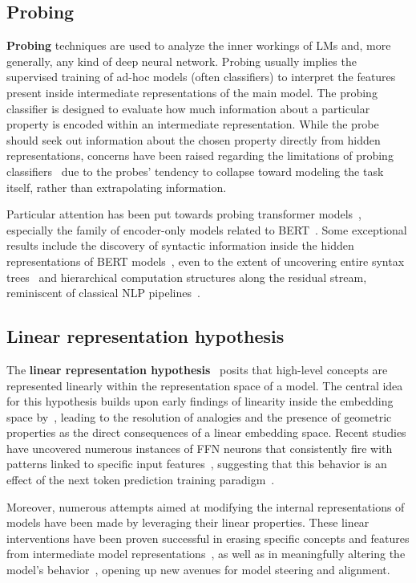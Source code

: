 \subsection{Probing}

\textbf{Probing} techniques are used to analyze the inner workings of LMs and, more generally, any kind of deep neural network.
Probing usually implies the supervised training of ad-hoc models (often classifiers) to interpret the features present inside intermediate representations of the main model.
The probing classifier is designed to evaluate how much information about a particular property is encoded within an intermediate representation.
While the probe should seek out information about the chosen property directly from hidden representations, concerns have been raised regarding the limitations of probing classifiers~\cite{belinkov2022} due to the probes' tendency to collapse toward modeling the task itself, rather than extrapolating information.

Particular attention has been put towards probing transformer models~\cite{chwang2024, macdiarmid2024, burns2023}, especially the family of encoder-only models related to BERT~\cite{devlin2019}.
Some exceptional results include the discovery of syntactic information inside the hidden representations of BERT models~\cite{tenney2019a, lin2019}, even to the extent of uncovering entire syntax trees~\cite{hewitt2019} and hierarchical computation structures along the residual stream, reminiscent of classical NLP pipelines~\cite{tenney2019b}.

\subsection{Linear representation hypothesis}

The \textbf{linear representation hypothesis}~\cite{park2023} posits that high-level concepts are represented linearly within the representation space of a model.
The central idea for this hypothesis builds upon early findings of linearity inside the embedding space by~\citet{mikolov2013}, leading to the resolution of analogies and the presence of geometric properties as the direct consequences of a linear embedding space.
Recent studies have uncovered numerous instances of FFN neurons that consistently fire with  patterns linked to specific input features~\cite{voita2024}, suggesting that this behavior is an effect of the next token prediction training paradigm~\cite{jiang2024}.

Moreover, numerous attempts aimed at modifying the internal representations of models have been made by leveraging their linear properties.
These linear interventions have been proven successful in erasing specific concepts and features from intermediate model representations~\cite{ravfogel2020, ravfogel2022, belrose2023b}, as well as in meaningfully altering the model's behavior~\cite{nanda2023, belrose2023b}, opening up new avenues for model steering and alignment. 

